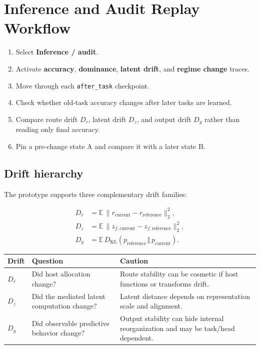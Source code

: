 \documentclass[11pt,a4paper]{article}
\newcommand{\ui}[1]{\textsf{\bfseries #1}}
\newcommand{\code}[1]{\texttt{#1}}
\begin{document}
\section{Inference and Audit Replay Workflow}

\begin{procedurebox}
\begin{enumerate}
  \item Select \ui{Inference / audit}.
  \item Activate \ui{accuracy}, \ui{dominance}, \ui{latent drift}, and \ui{regime change} traces.
  \item Move through each \code{after\_task} checkpoint.
  \item Check whether old-task accuracy changes after later tasks are learned.
  \item Compare route drift $D_r$, latent drift $D_z$, and output drift $D_y$ rather than reading only final accuracy.
  \item Pin a pre-change state A and compare it with a later state B.
\end{enumerate}
\end{procedurebox}

\subsection{Drift hierarchy}

The prototype supports three complementary drift families:

\begin{align*}
D_r &= \mathbb{E}\,\lVert r_{\mathrm{current}}-r_{\mathrm{reference}}\rVert_2^2,\\
D_z &= \mathbb{E}\,\lVert z_{f,\mathrm{current}}-z_{f,\mathrm{reference}}\rVert_2^2,\\
D_y &= \mathbb{E}\,D_{\mathrm{KL}}\!\left(p_{\mathrm{reference}}\,\Vert\,p_{\mathrm{current}}\right).
\end{align*}

\begin{table}[h]
\centering
\begin{tabularx}{\textwidth}{@{}P{24mm}P{48mm}Y@{}}
\toprule
\textbf{Drift} & \textbf{Question} & \textbf{Caution}\\
\midrule
$D_r$ & Did host allocation change? & Route stability can be cosmetic if host functions or transforms drift.\\
$D_z$ & Did the mediated latent computation change? & Latent distance depends on representation scale and alignment.\\
$D_y$ & Did observable predictive behavior change? & Output stability can hide internal reorganization and may be task/head dependent.\\
\bottomrule
\end{tabularx}
\end{table}
\end{document}

